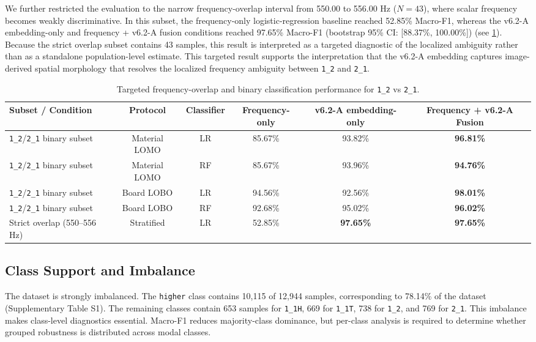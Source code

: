 \documentclass[review,3p,times]{elsarticle}
\begin{document}
We further restricted the evaluation to the narrow frequency-overlap interval from 550.00 to 556.00 Hz ($N=43$), where scalar frequency becomes weakly discriminative. In this subset, the frequency-only logistic-regression baseline reached 52.85\% Macro-F1, whereas the v6.2-A embedding-only and frequency + v6.2-A fusion conditions reached 97.65\% Macro-F1 (bootstrap 95\% CI: [88.37\%, 100.00\%]) (see \cref{tab:table_overlap}). Because the strict overlap subset contains 43 samples, this result is interpreted as a targeted diagnostic of the localized ambiguity rather than as a standalone population-level estimate. This targeted result supports the interpretation that the v6.2-A embedding captures image-derived spatial morphology that resolves the localized frequency ambiguity between \texttt{1\_2} and \texttt{2\_1}.

\begin{table}[htbp]
\centering
\caption{Targeted frequency-overlap and binary classification performance for \texttt{1\_2} vs \texttt{2\_1}.}
\label{tab:table_overlap}
\begin{tabular}{lccccc}
\toprule
\textbf{Subset / Condition} & \textbf{Protocol} & \textbf{Classifier} & \textbf{Frequency-only} & \textbf{v6.2-A embedding-only} & \textbf{Frequency + v6.2-A Fusion} \\
\midrule
\texttt{1\_2}/\texttt{2\_1} binary subset & Material LOMO & LR & 85.67\% & 93.82\% & \textbf{96.81\%} \\
\texttt{1\_2}/\texttt{2\_1} binary subset & Material LOMO & RF & 85.67\% & 93.96\% & \textbf{94.76\%} \\
\texttt{1\_2}/\texttt{2\_1} binary subset & Board LOBO & LR & 94.56\% & 92.56\% & \textbf{98.01\%} \\
\texttt{1\_2}/\texttt{2\_1} binary subset & Board LOBO & RF & 92.68\% & 95.02\% & \textbf{96.02\%} \\
Strict overlap (550--556 Hz) & Stratified & LR & 52.85\% & \textbf{97.65\%} & \textbf{97.65\%} \\
\bottomrule
\end{tabular}
\end{table}

\subsection{Class Support and Imbalance}
The dataset is strongly imbalanced. The \texttt{higher} class contains 10,115 of 12,944 samples, corresponding to 78.14\% of the dataset (Supplementary Table S1). The remaining classes contain 653 samples for \texttt{1\_1H}, 669 for \texttt{1\_1T}, 738 for \texttt{1\_2}, and 769 for \texttt{2\_1}. This imbalance makes class-level diagnostics essential. Macro-F1 reduces majority-class dominance, but per-class analysis is required to determine whether grouped robustness is distributed across modal classes.
\end{document}
